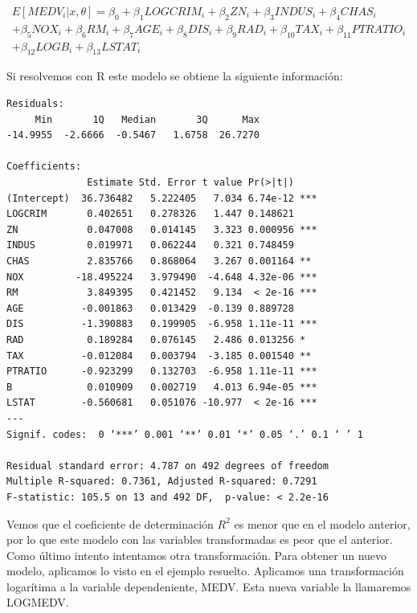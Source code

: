 \documentclass[12pt,a4paper,twoside,openright,titlepage,final]{article}
\begin{document}
\begin{multline*}
E[MEDV_i |x, \theta] = \beta_0 + \beta_1 LOGCRIM_i + \beta_2 ZN_i + \beta_3 INDUS_i + \beta_4 CHAS_i \\ + \beta_5 NOX_i + \beta_6 RM_i + \beta_7 AGE_i + \beta_8 DIS_i + \beta_9 RAD_i + \beta_{10} TAX_i + \beta_{11} PTRATIO_i \\ + \beta_{12} LOGB_i + \beta_{13} LSTAT_i
\end{multline*}

Si resolvemos con R este modelo se obtiene la siguiente información:

\begin{verbatim}
Residuals:
     Min       1Q   Median       3Q      Max 
-14.9955  -2.6666  -0.5467   1.6758  26.7270 

Coefficients:
              Estimate Std. Error t value Pr(>|t|)    
(Intercept)  36.736482   5.222405   7.034 6.74e-12 ***
LOGCRIM       0.402651   0.278326   1.447 0.148621    
ZN            0.047008   0.014145   3.323 0.000956 ***
INDUS         0.019971   0.062244   0.321 0.748459    
CHAS          2.835766   0.868064   3.267 0.001164 ** 
NOX         -18.495224   3.979490  -4.648 4.32e-06 ***
RM            3.849395   0.421452   9.134  < 2e-16 ***
AGE          -0.001863   0.013429  -0.139 0.889728    
DIS          -1.390883   0.199905  -6.958 1.11e-11 ***
RAD           0.189284   0.076145   2.486 0.013256 *  
TAX          -0.012084   0.003794  -3.185 0.001540 ** 
PTRATIO      -0.923299   0.132703  -6.958 1.11e-11 ***
B             0.010909   0.002719   4.013 6.94e-05 ***
LSTAT        -0.560681   0.051076 -10.977  < 2e-16 ***
---
Signif. codes:  0 ‘***’ 0.001 ‘**’ 0.01 ‘*’ 0.05 ‘.’ 0.1 ‘ ’ 1 

Residual standard error: 4.787 on 492 degrees of freedom
Multiple R-squared: 0.7361,	Adjusted R-squared: 0.7291 
F-statistic: 105.5 on 13 and 492 DF,  p-value: < 2.2e-16 
\end{verbatim}

Vemos que el coeficiente de determinación $R^2$ es menor que en el modelo anterior, por lo que este modelo con las variables transformadas es peor que el anterior.\\

Como último intento intentamos otra transformación. Para obtener un nuevo modelo, aplicamos lo visto en el ejemplo resuelto. Aplicamos una transformación logarítima a la variable dependeniente, MEDV. Esta nueva variable la llamaremos LOGMEDV.\\
\end{document}
